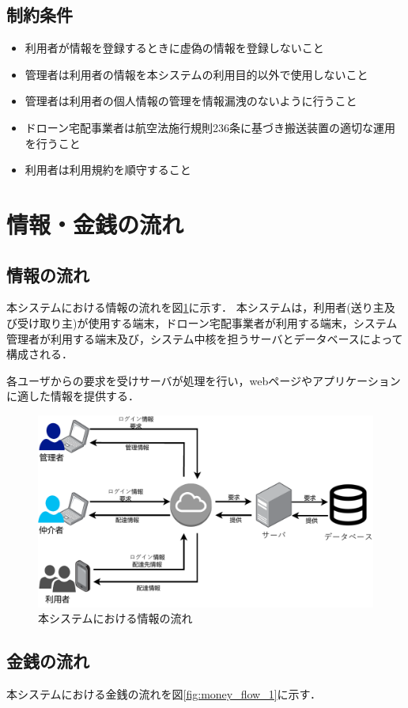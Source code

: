 \documentclass[a4paper, titlepage]{jsarticle}
\begin{document}
\subsection{制約条件}
\begin{itemize}
	\item 利用者が情報を登録するときに虚偽の情報を登録しないこと
	\item 管理者は利用者の情報を本システムの利用目的以外で使用しないこと
	\item 管理者は利用者の個人情報の管理を情報漏洩のないように行うこと
	\item ドローン宅配事業者は航空法施行規則236条に基づき搬送装置の適切な運用を行うこと
	\item 利用者は利用規約を順守すること
\end{itemize}
\section{情報・金銭の流れ}

\subsection{情報の流れ}
本システムにおける情報の流れを図\ref{fig:info_flow_1}に示す．
本システムは，利用者(送り主及び受け取り主)が使用する端末，ドローン宅配事業者が利用する端末，システム管理者が利用する端末及び，システム中核を担うサーバとデータベースによって構成される．

各ユーザからの要求を受けサーバが処理を行い，webページやアプリケーションに適した情報を提供する．

\begin{figure}[H]
  \centering
  \includegraphics[width=0.6\linewidth]{./info_flow.pdf}
  \caption{本システムにおける情報の流れ}
  \label{fig:info_flow_1}
\end{figure}

\subsection{金銭の流れ}
本システムにおける金銭の流れを図\ref{fig:money_flow_1}に示す．
\end{document}
